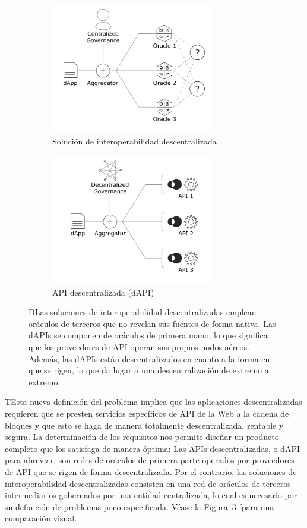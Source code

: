 \documentclass[11pt]{article}
\begin{document}
\begin{figure}
     \centering
     \begin{subfigure}{0.49\textwidth}
        \centering
         \includegraphics[height=5.7cm]{fig/solutions-comparison-a.pdf}
         \caption{Solución de interoperabilidad descentralizada}
         \label{fig:solutions-comparison-3rd}
     \end{subfigure}
     \hfill
     \begin{subfigure}{0.49\textwidth}
        \centering
         \includegraphics[height=5.7cm]{fig/solutions-comparison-b.pdf}
         \caption{API descentralizada (dAPI)}
         \label{fig:solutions-comparison-1st}
     \end{subfigure}
     \caption{DLas soluciones de interoperabilidad descentralizadas emplean oráculos de terceros que no revelan sus fuentes de forma nativa. Las dAPIs se componen de oráculos de primera mano, lo que significa que los proveedores de API operan sus propios nodos aéreos. Además, las dAPIs están descentralizados en cuanto a la forma en que se rigen, lo que da lugar a una descentralización de extremo a extremo. }
    \label{fig:solutions-comparison}
\end{figure}

TEsta nueva definición del problema implica que las aplicaciones descentralizadas requieren que se presten servicios específicos de API de la Web a la cadena de bloques y que esto se haga de manera totalmente descentralizada, rentable y segura. La determinación de los requisitos nos permite diseñar un producto completo que los satisfaga de manera óptima: Las APIs descentralizadas, o dAPI para abreviar, son redes de oráculos de primera parte operados por proveedores de API que se rigen de forma descentralizada. Por el contrario, las soluciones de interoperabilidad descentralizadas consisten en una red de oráculos de terceros intermediarios gobernados por una entidad centralizada, lo cual es necesario por su definición de problemas poco especificada.
Véase la Figura~\ref{fig:solutions-comparison} fpara una comparación visual. 
\end{document}
